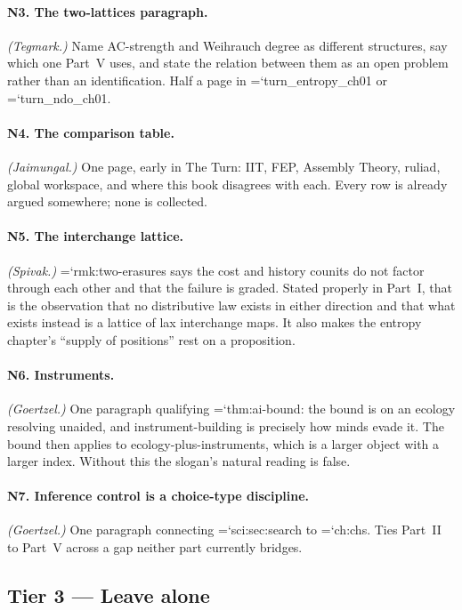 \documentclass[11pt,letterpaper]{article}
\newcommand{\loc}[1]{{\small\ttfamily\color{accent}\hyphenchar\font=`\-\relax #1}}
\begin{document}
\paragraph{N3. The two-lattices paragraph.} \emph{(Tegmark.)} Name
AC-strength and Weihrauch degree as different structures, say which one
Part~V uses, and state the relation between them as an open problem
rather than an identification. Half a page in \loc{turn\_entropy\_ch01}
or \loc{turn\_ndo\_ch01}.

\paragraph{N4. The comparison table.} \emph{(Jaimungal.)} One page,
early in The Turn: IIT, FEP, Assembly Theory, ruliad, global workspace,
and where this book disagrees with each. Every row is already argued
somewhere; none is collected.

\paragraph{N5. The interchange lattice.} \emph{(Spivak.)}
\loc{rmk:two-erasures} says the cost and history counits do not factor
through each other and that the failure is graded. Stated properly in
Part~I, that is the observation that no distributive law exists in
either direction and that what exists instead is a lattice of lax
interchange maps. It also makes the entropy chapter's ``supply of
positions'' rest on a proposition.

\paragraph{N6. Instruments.} \emph{(Goertzel.)} One paragraph
qualifying \loc{thm:ai-bound}: the bound is on an ecology resolving
unaided, and instrument-building is precisely how minds evade it. The
bound then applies to ecology-plus-instruments, which is a larger
object with a larger index. Without this the slogan's natural reading
is false.

\paragraph{N7. Inference control is a choice-type discipline.}
\emph{(Goertzel.)} One paragraph connecting \loc{sci:sec:search} to
\loc{ch:chs}. Ties Part~II to Part~V across a gap neither part
currently bridges.

\subsection*{Tier 3 --- Leave alone}
\end{document}
